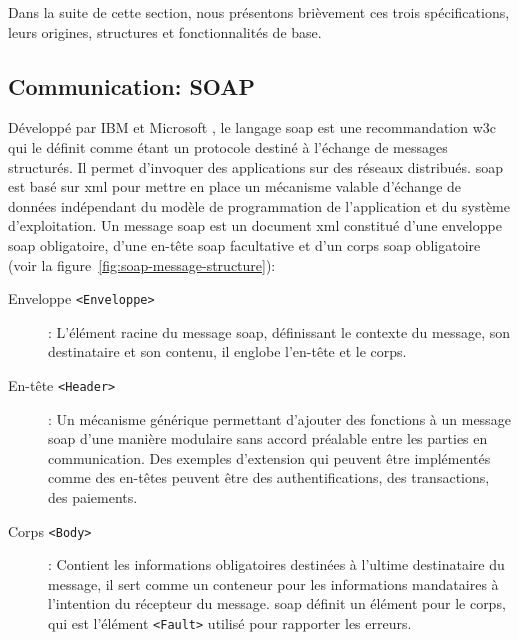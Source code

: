

Dans la suite de cette section, nous présentons brièvement ces trois
spécifications, leurs origines, structures et fonctionnalités de base.

  \subsection{Communication: SOAP}
  \label{sec:soap}
  Développé par IBM et Microsoft \cite{box2000simple}, le langage
  \acrshort{soap} est une recommandation \acrshort{w3c}
  \cite{mitra2003soap} qui le définit comme étant un protocole destiné
  à l'échange de messages structurés. Il permet d'invoquer des
  applications sur des réseaux distribués. \acrshort{soap} est basé
  sur \acrshort{xml} pour mettre en place un mécanisme valable
  d'échange de données indépendant du modèle de programmation de
  l'application et du système d'exploitation. Un message
  \acrshort{soap} est un document \acrshort{xml} constitué d'une
  enveloppe \acrshort{soap} obligatoire, d'une en-tête \acrshort{soap}
  facultative et d'un corps \acrshort{soap} obligatoire (voir la
  figure~\ref{fig:soap-message-structure}):

  

  \renewcommand{\descriptionlabel}[1]{\hspace{0.5cm}\textbullet~\textsf{#1}}
  \begin{description}
  \item[Enveloppe \texttt{<Enveloppe>}]: L'élément racine du message
    \acrshort{soap}, définissant le contexte du message, son
    destinataire et son contenu, il englobe l'en-tête et le corps.

  \item[En-tête \texttt{<Header>}]: Un mécanisme générique permettant
    d'ajouter des fonctions à un message \acrshort{soap} d'une manière
    modulaire sans accord préalable entre les parties en
    communication. Des exemples d'extension qui peuvent être
    implémentés comme des en-têtes peuvent être des authentifications,
    des transactions, des paiements.

  \item[Corps \texttt{<Body>}]: Contient les informations obligatoires
    destinées à l'ultime destinataire du message, il sert comme un
    conteneur pour les informations mandataires à l'intention du
    récepteur du message. \acrshort{soap} définit un élément pour le
    corps, qui est l'élément \texttt{<Fault>} utilisé pour rapporter
    les erreurs.
  \end{description}
  \enddescription


